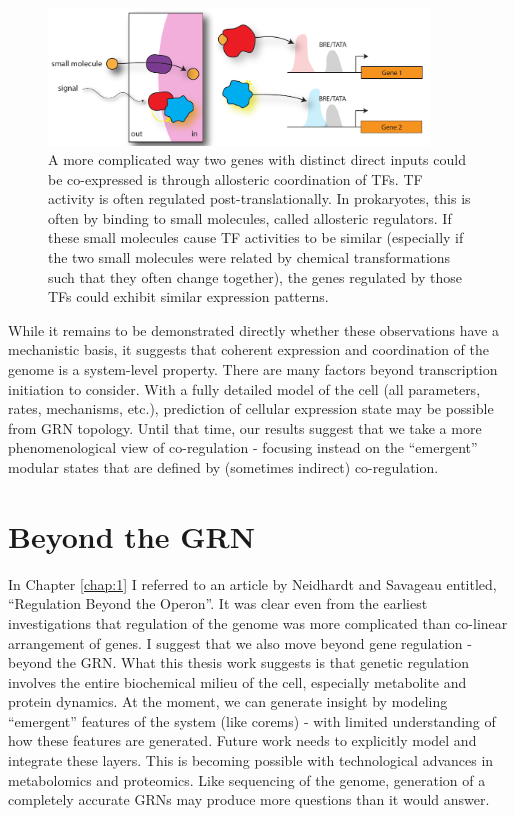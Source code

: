 \begin{figure}[h!]
    \centering
    \includegraphics[width=0.9\textwidth]{figures/equif}
 	\caption[Indirect co-regulation by equifinality]{A more complicated way two genes with distinct direct inputs could be co-expressed is through allosteric coordination of TFs. TF activity is often regulated post-translationally. In prokaryotes, this is often by binding to small molecules, called allosteric regulators. If these small molecules cause TF activities to be similar (especially if the two small molecules were related by chemical transformations such that they often change together), the genes regulated by those TFs could exhibit similar expression patterns.   
 	}
\label{fig:chap5:equif}
\end{figure}

While it remains to be demonstrated directly whether these observations have a mechanistic basis, it suggests that coherent expression and coordination of the genome is a system-level property. There are many factors beyond transcription initiation to consider. With a fully detailed model of the cell (all parameters, rates, mechanisms, etc.), prediction of cellular expression state may be possible from GRN topology. Until that time, our results suggest that we take a more phenomenological view of co-regulation - focusing instead on the ``emergent'' modular states that are defined by (sometimes indirect) co-regulation. 

\section{Beyond the GRN}

In Chapter \ref{chap:1} I referred to an article by Neidhardt and Savageau entitled, ``Regulation Beyond the Operon''. It was clear even from the earliest investigations that regulation of the genome was more complicated than co-linear arrangement of genes. I suggest that we also move beyond gene regulation - beyond the GRN. What this thesis work suggests is that genetic regulation involves the entire biochemical milieu of the cell, especially metabolite and protein dynamics. At the moment, we can generate insight by modeling ``emergent'' features of the system (like corems) - with limited understanding of how these features are generated. Future work needs to explicitly model and integrate these layers. This is becoming possible with technological advances in metabolomics and proteomics. Like sequencing of the genome, generation of a completely accurate GRNs may produce more questions than it would answer.  




 

 
 